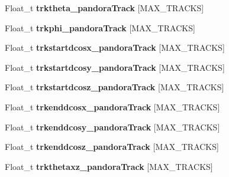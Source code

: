 \begin{DoxyCompactItemize}
\item 
\hypertarget{classanatree_a19cf8542bace3df2c75c84fd1a9f79a3}{Float\-\_\-t {\bfseries trktheta\-\_\-pandora\-Track} \mbox{[}M\-A\-X\-\_\-\-T\-R\-A\-C\-K\-S\mbox{]}}\label{classanatree_a19cf8542bace3df2c75c84fd1a9f79a3}

\item 
\hypertarget{classanatree_a461c0ab2f9a673d271f39c309d30c1cc}{Float\-\_\-t {\bfseries trkphi\-\_\-pandora\-Track} \mbox{[}M\-A\-X\-\_\-\-T\-R\-A\-C\-K\-S\mbox{]}}\label{classanatree_a461c0ab2f9a673d271f39c309d30c1cc}

\item 
\hypertarget{classanatree_a2a476447fc959e075cf018e75f1e676e}{Float\-\_\-t {\bfseries trkstartdcosx\-\_\-pandora\-Track} \mbox{[}M\-A\-X\-\_\-\-T\-R\-A\-C\-K\-S\mbox{]}}\label{classanatree_a2a476447fc959e075cf018e75f1e676e}

\item 
\hypertarget{classanatree_a5cd7c212620288052de913f877c3e5bd}{Float\-\_\-t {\bfseries trkstartdcosy\-\_\-pandora\-Track} \mbox{[}M\-A\-X\-\_\-\-T\-R\-A\-C\-K\-S\mbox{]}}\label{classanatree_a5cd7c212620288052de913f877c3e5bd}

\item 
\hypertarget{classanatree_a47d8c8451ce118eefb61124b3d29e117}{Float\-\_\-t {\bfseries trkstartdcosz\-\_\-pandora\-Track} \mbox{[}M\-A\-X\-\_\-\-T\-R\-A\-C\-K\-S\mbox{]}}\label{classanatree_a47d8c8451ce118eefb61124b3d29e117}

\item 
\hypertarget{classanatree_aa0aa24445aa4728bf37f43695db4cfb9}{Float\-\_\-t {\bfseries trkenddcosx\-\_\-pandora\-Track} \mbox{[}M\-A\-X\-\_\-\-T\-R\-A\-C\-K\-S\mbox{]}}\label{classanatree_aa0aa24445aa4728bf37f43695db4cfb9}

\item 
\hypertarget{classanatree_a095b032439341cd11848dbfbd5710f72}{Float\-\_\-t {\bfseries trkenddcosy\-\_\-pandora\-Track} \mbox{[}M\-A\-X\-\_\-\-T\-R\-A\-C\-K\-S\mbox{]}}\label{classanatree_a095b032439341cd11848dbfbd5710f72}

\item 
\hypertarget{classanatree_af6279aa8e9f6ec8c1f86bc3f0eadd309}{Float\-\_\-t {\bfseries trkenddcosz\-\_\-pandora\-Track} \mbox{[}M\-A\-X\-\_\-\-T\-R\-A\-C\-K\-S\mbox{]}}\label{classanatree_af6279aa8e9f6ec8c1f86bc3f0eadd309}

\item 
\hypertarget{classanatree_ad9f1e172e403a07751ea043eae09071a}{Float\-\_\-t {\bfseries trkthetaxz\-\_\-pandora\-Track} \mbox{[}M\-A\-X\-\_\-\-T\-R\-A\-C\-K\-S\mbox{]}}\label{classanatree_ad9f1e172e403a07751ea043eae09071a}


\end{DoxyCompactItemize}
